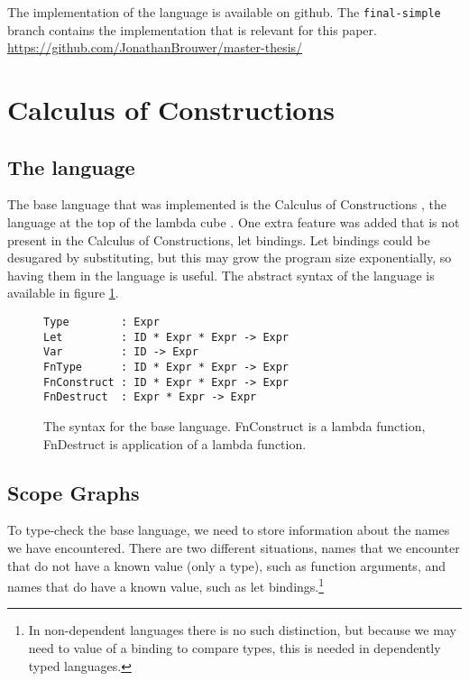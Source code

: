 \documentclass[a4paper,UKenglish,cleveref, autoref, thm-restate]{oasics-v2021}
\begin{document}
The implementation of the language is available on github. The \verb|final-simple| branch contains the implementation that is relevant for this paper. \\
\url{https://github.com/JonathanBrouwer/master-thesis/}

\section{Calculus of Constructions}

\subsection{The language}

The base language that was implemented is the Calculus of Constructions \cite{Coquand_Huet_1988}, the language at the top of the lambda cube \cite{lambda_cube}. One extra feature was added that is not present in the Calculus of Constructions, let bindings. Let bindings could be desugared by substituting, but this may grow the program size exponentially, so having them in the language is useful. The abstract syntax of the language is available in figure \ref{fig:syntax}.

\begin{figure}[h]
\begin{lstlisting}
Type        : Expr
Let         : ID * Expr * Expr -> Expr
Var         : ID -> Expr
FnType      : ID * Expr * Expr -> Expr
FnConstruct : ID * Expr * Expr -> Expr
FnDestruct  : Expr * Expr -> Expr
\end{lstlisting}
\caption{The syntax for the base language. FnConstruct is a lambda function, FnDestruct is application of a lambda function.}
\label{fig:syntax}
\end{figure}


\subsection{Scope Graphs}

To type-check the base language, we need to store information about the names we have encountered. There are two different situations, names that we encounter that do not have a known value (only a type), such as function arguments, and names that do have a known value, such as let bindings.\footnote{In non-dependent languages there is no such distinction, but because we may need to value of a binding to compare types, this is needed in dependently typed languages.}
\end{document}
